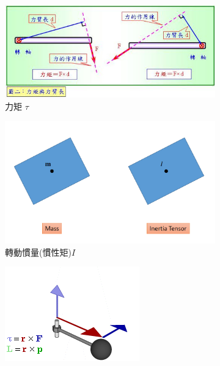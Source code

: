 \begin{figure}[h]
    \begin{subfigure}[b]{0.3\linewidth}
    \includegraphics[width=\linewidth]{./resources/physics/tau.png}
    \caption{力矩 $\tau$}
    \end{subfigure}
    \begin{subfigure}[b]{0.3\linewidth}
    \includegraphics[width=\linewidth]{./resources/physics/Interia.png}
    \caption{轉動慣量(慣性矩)$I$}
    \end{subfigure}
    \begin{subfigure}[b]{0.3\linewidth}
    \includegraphics[width=\linewidth]{./resources/physics/L.png}

\end{subfigure}
\end{figure}
